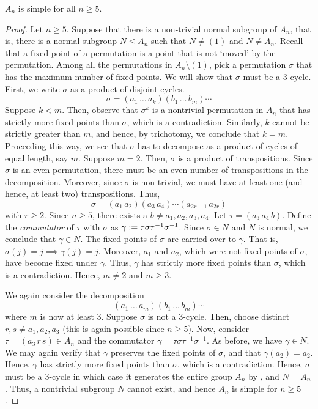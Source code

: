 \begin{theorem}[Galois]
    $A_n$ is simple for all $n \geq 5$.
\end{theorem}
\begin{proof}
    Let $n \geq 5$. Suppose that there is a non-trivial normal subgroup of $A_n$, that is, there is a normal subgroup $N \trianglelefteq A_n$ such that $N \neq (1)$ and $N \neq A_n$. Recall that a fixed point of a permutation is a point that is not `moved' by the permutation. Among all the permutations in $A_n \setminus (1)$, pick a permutation $\sigma$ that has the maximum number of fixed points. We will show that $\sigma$ must be a $3$-cycle. First, we write $\sigma$ as a product of disjoint cycles. 
    \[
        \sigma = (a_1 \, \ldots \, a_k) (b_1 \, \ldots \, b_m) \cdots
    \]
    Suppose $k < m$. Then, observe that $\sigma^k$ is a nontrivial permutation in $A_n$ that has strictly more fixed points than $\sigma$, which is a contradiction. Similarly, $k$ cannot be strictly greater than $m$, and hence, by trichotomy, we conclude that $k = m$. Proceeding this way, we see that $\sigma$ has to decompose as a product of cycles of equal length, say $m$. Suppose $m = 2$. Then, $\sigma$ is a product of transpositions. Since $\sigma$ is an even permutation, there must be an even number of transpositions in the decomposition. Moreover, since $\sigma$ is non-trivial, we must have at least one (and hence, at least two) transpositions. Thus, 
    \[
        \sigma = (a_1 \, a_2)(a_3 \, a_4) \cdots (a_{2r-1} \, a_{2r})
    \]
    with $r \geq 2$. Since $n \geq 5$, there exists a $b \neq a_1, a_2, a_3, a_4$. Let $\tau = (a_3 \, a_4 \, b)$. Define the \emph{commutator} of $\tau$ with $\sigma$ as $\gamma \vcentcolon= \tau\sigma\tau^{-1}\sigma^{-1}$. Since $\sigma \in N$ and $N$ is normal, we conclude that $\gamma \in N$. The fixed points of $\sigma$ are carried over to $\gamma$. That is, $\sigma(j) = j \implies \gamma(j) = j$. Moreover, $a_1$ and $a_2$, which were not fixed points of $\sigma$, have become fixed under $\gamma$. Thus, $\gamma$ has strictly more fixed points than $\sigma$, which is a contradiction. Hence, $m \neq 2$ and $m \geq 3$. 
    
    We again consider the decomposition
    \[
        (a_1 \, \ldots \, a_m)(b_1 \, \ldots \, b_m) \cdots
    \]
    where $m$ is now at least $3$. Suppose $\sigma$ is not a $3$-cycle. Then, choose distinct $r,s \neq a_1, a_2, a_3$ (this is again possible since $n \geq 5$). Now, consider $\tau = (a_3 \, r \, s) \in A_n$ and the commutator $\gamma = \tau\sigma\tau^{-1}\sigma^{-1}$. As before, we have $\gamma \in N$. We may again verify that $\gamma$ preserves the fixed points of $\sigma$, and that $\gamma(a_2) = a_2$. Hence, $\gamma$ has strictly more fixed points than $\sigma$, which is a contradiction. Hence, $\sigma$ must be a $3$-cycle in which case it generates the entire group $A_n$ by , and $N = A_n$. Thus, a nontrivial subgroup $N$ cannot exist, and hence $A_n$ is simple for $n \geq 5$. 
\end{proof}